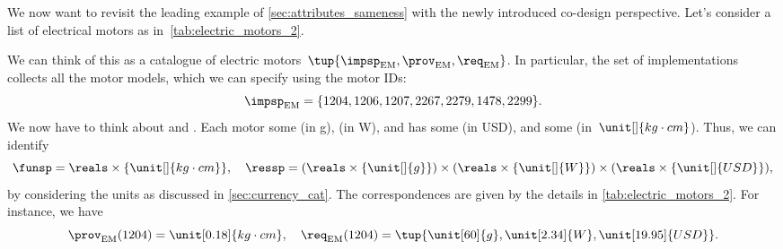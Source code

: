 \begin{example}
  \label{exa:dpi_elmotor}
  We now want to revisit the leading example of \cref{sec:attributes_sameness} with the newly introduced co-design perspective. Let's consider a list of electrical motors as in~\cref{tab:electric_motors_2}.
  \begin{table*}[h]
    \centering
    \caption{A simplified catalogue of motors.}
    \label{tab:electric_motors_2}
  \end{table*}

  We can think of this as a catalogue of electric motors~$\tup{\impsp_\mathrm{EM},\prov_\mathrm{EM},\req_\mathrm{EM}}$.
  In particular, the set of implementations collects all the motor models, which we can specify using the motor IDs:
  \begin{equation}
    \impsp_\mathrm{EM}=\{1204,1206,1207,2267,2279,1478,2299 \}.
  \end{equation}
  We now have to think about  and .
  Each motor  some  (in \unit[]{g}),  (in \unit[]{W}), and has some  (in USD), and  some  (in~$\unit[]{kg\cdot cm}$).
  Thus, we can identify
  \begin{equation*}
    \funsp =\reals\times \{\unit[]{kg\cdot cm}\},\quad \ressp=(\reals\times \{\unit[]{g}\})\times (\reals\times \{\unit[]{W}\})\times (\reals\times \{\unit[]{USD}\}),
  \end{equation*}
  by considering the units as discussed in \cref{sec:currency_cat}.
  The correspondences are given by the details in \cref{tab:electric_motors_2}.
  For instance, we have
  \begin{equation}
    \prov_\mathrm{EM}(1204)=\unit[0.18]{kg\cdot cm}, \quad \req_\mathrm{EM}(1204)=\tup{\unit[60]{g},\unit[2.34]{W},\unit[19.95]{USD}}.
  \end{equation}


\end{example}
